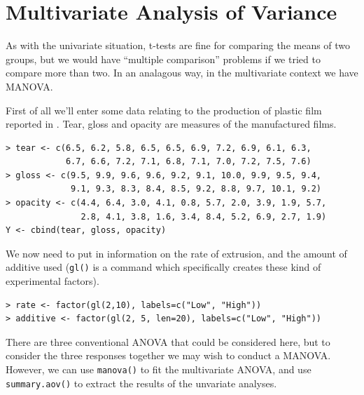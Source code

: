 

\section{Multivariate Analysis of Variance}
\label{manova}

As with the univariate situation, t-tests are fine for comparing the means of two groups, but we would have ``multiple comparison'' problems if we tried to compare more than two.   In an analagous way, in the multivariate context we have MANOVA.

First of all we'll enter some data relating to the production of plastic film reported in \cite{Krzanowski:2000}.   Tear, gloss and opacity are measures of the manufactured films.

\singlespacing
\begin{verbatim}
> tear <- c(6.5, 6.2, 5.8, 6.5, 6.5, 6.9, 7.2, 6.9, 6.1, 6.3,                
            6.7, 6.6, 7.2, 7.1, 6.8, 7.1, 7.0, 7.2, 7.5, 7.6)
> gloss <- c(9.5, 9.9, 9.6, 9.6, 9.2, 9.1, 10.0, 9.9, 9.5, 9.4,
             9.1, 9.3, 8.3, 8.4, 8.5, 9.2, 8.8, 9.7, 10.1, 9.2)
> opacity <- c(4.4, 6.4, 3.0, 4.1, 0.8, 5.7, 2.0, 3.9, 1.9, 5.7,
               2.8, 4.1, 3.8, 1.6, 3.4, 8.4, 5.2, 6.9, 2.7, 1.9)
Y <- cbind(tear, gloss, opacity)
\end{verbatim}
\onehalfspacing

We now need to put in information on the rate of extrusion, and the amount of additive used (\texttt{gl()} is a command which specifically creates these kind of experimental factors).

\singlespacing
\begin{verbatim}
> rate <- factor(gl(2,10), labels=c("Low", "High"))
> additive <- factor(gl(2, 5, len=20), labels=c("Low", "High"))
\end{verbatim}
\onehalfspacing

There are three conventional ANOVA that could be considered here, but to consider the three responses together we may wish to conduct a MANOVA.   However, we can use \texttt{manova()} to fit the multivariate ANOVA, and use \texttt{summary.aov()} to extract the results of the unvariate analyses.

